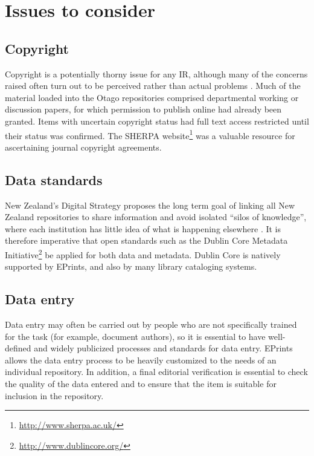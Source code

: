 \documentclass[12pt,pdftex,a4paper,titlepage]{article}
\begin{document}
\section{Issues to consider}


\subsection{Copyright}

Copyright is a potentially thorny issue for any IR, although many of the concerns raised often turn out to be perceived rather than actual problems \cite{EPri-O-2005-SelfFAQ}. Much of the material loaded into the Otago repositories comprised departmental working or discussion papers, for which permission to publish online had already been granted. Items with uncertain copyright status had full text access restricted until their status was confirmed. The SHERPA website\footnote{\url{http://www.sherpa.ac.uk/}} was a valuable resource for ascertaining journal copyright agreements.


\subsection{Data standards}

New Zealand's Digital Strategy proposes the long term goal of linking all New Zealand repositories to share information and avoid isolated ``silos of knowledge'', where each institution has little idea of what is happening elsewhere \cite{NZG-2005-digital_strategy}. It is therefore imperative that open standards such as the Dublin Core Metadata Initiative\footnote{\url{http://www.dublincore.org/}} be applied for both data and metadata. Dublin Core is natively supported by EPrints, and also by many library cataloging systems.


\subsection{Data entry}

Data entry may often be carried out by people who are not specifically trained for the task (for example, document authors), so it is essential to have well-defined and widely publicized processes and standards for data entry. EPrints allows the data entry process to be heavily customized to the needs of an individual repository. In addition, a final editorial verification is essential to check the quality of the data entered and to ensure that the item is suitable for inclusion in the repository.
\end{document}
